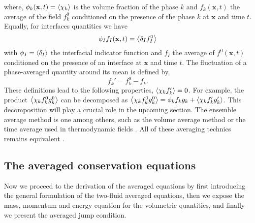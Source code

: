 where, $\phi_k(\textbf{x},t) = \left<\chi_k\right>$ is the volume fraction of the phase $k$
and $f_k(\textbf{x},t)$ the average of the field $f_k^0$ conditioned on the presence of the phase $k$ at $\textbf{x}$ and time $t$.
Equally, for interfaces quantities we have 
\begin{equation}
    \phi_I f_I (\textbf{x},t) = \left<\delta_I f_I^0\right>
\end{equation}
with $\phi_I = \left<\delta_I\right>$ the interfacial indicator function and $f_I$ the average of $f^0(\textbf{x},t)$ conditioned on the presence of an interface at $\textbf{x}$ and time $t$. 
The fluctuation of a phase-averaged quantity around its mean is defined by,
\begin{equation}
    f_k' = f_k^0 - f_k.
    \label{eq:def_fluctu}
\end{equation}
These definitions lead to the following properties, $\left<\chi_k f'_k\right> = 0$. 
For example, the product $\left<\chi_k f^0_kg^0_k\right>$ can be decomposed as $\left<\chi_k f_k^0g_k^0\right>=\phi_k f_kg_k + \left<\chi_k f'_kg'_k\right>$. 
This decomposition will play a crucial role in the upcoming section. 
The ensemble average method is one among others, such as the volume average method\citep{jackson1997locally} or the time average
used in thermodynamic fields \citep{ishii2010thermo}.
All of these averaging technics remains equivalent \citep{jackson1997locally,zhang1997momentum}. 

\subsection{The averaged conservation equations}
Now we proceed to the derivation of the averaged equations by first introducing the general formulation of the two-fluid averaged equations, then we expose the mass, momentum and energy equation for the volumetric quantities, and finally we present the averaged jump condition. 

